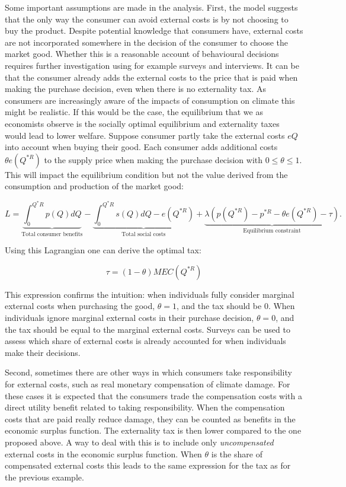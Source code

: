 \documentclass[
]{book}
\begin{document}
Some important assumptions are made in the analysis. First, the model suggests that the only way the consumer can avoid external costs is by not choosing to buy the product. Despite potential knowledge that consumers have, external costs are not incorporated somewhere in the decision of the consumer to choose the market good. Whether this is a reasonable account of behavioural decisions requires further investigation using for example surveys and interviews. It can be that the consumer already adds the external costs to the price that is paid when making the purchase decision, even when there is no externality tax. As consumers are increasingly aware of the impacts of consumption on climate this might be realistic. If this would be the case, the equilibrium that we as economists observe is the socially optimal equilibrium and externality taxes would lead to lower welfare. Suppose consumer partly take the external costs \(eQ\) into account when buying their good. Each consumer adds additional costs \(\theta e(Q^{* R})\) to the supply price when making the purchase decision with \(0 \leq \theta \leq 1\). This will impact the equilibrium condition but not the value derived from the consumption and production of the market good:

\begin{equation}
L = \underbrace{\int_0^{Q^\ast R} p(Q)dQ}_\text{Total consumer benefits} - \underbrace{\int^{Q^\ast R}_0 s(Q)dQ - e(Q^{\ast R})}_\text{Total social costs} + \underbrace{\lambda(p(Q^{\ast R}) - p^{\ast R} - \theta e(Q^{* R}) - \tau)}_\text{Equilibrium constraint}.
\end{equation}

Using this Lagrangian one can derive the optimal tax:

\begin{equation}
\tau = (1 - \theta) MEC(Q^{* R})
\end{equation}

This expression confirms the intuition: when individuals fully consider marginal external costs when purchasing the good, \(\theta=1\), and the tax should be \(0\). When individuals ignore marginal external costs in their purchase decision, \(\theta=0\), and the tax should be equal to the marginal external costs. Surveys can be used to assess which share of external costs is already accounted for when individuals make their decisions.

Second, sometimes there are other ways in which consumers take responsibility for external costs, such as real monetary compensation of climate damage. For these cases it is expected that the consumers trade the compensation costs with a direct utility benefit related to taking responsibility. When the compensation costs that are paid really reduce damage, they can be counted as benefits in the economic surplus function. The externality tax is then lower compared to the one proposed above. A way to deal with this is to include only \emph{uncompensated} external costs in the economic surplus function. When \(\theta\) is the share of compensated external costs this leads to the same expression for the tax as for the previous example.
\end{document}
